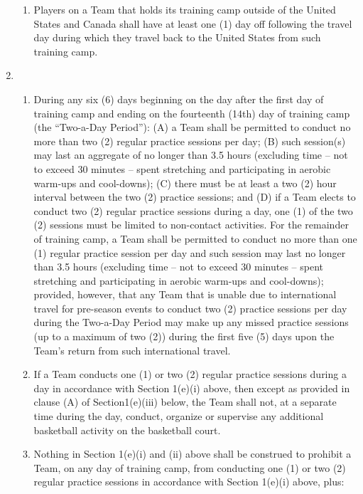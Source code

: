 \documentclass[
]{book}
\providecommand{\tightlist}{%
  \setlength{\itemsep}{0pt}\setlength{\parskip}{0pt}}
\begin{document}
\begin{enumerate}
\begin{enumerate}
  \item
    Players on a Team that holds its training camp outside of the United States and Canada shall have at least one (1) day off following the travel day during which they travel back to the United States from such training camp.
  \end{enumerate}
\item
  \begin{enumerate}
  \def\labelenumii{(\roman{enumii})}
  \tightlist
  \item
    During any six (6) days beginning on the day after the first day of training camp and ending on the fourteenth (14th) day of training camp (the ``Two-a-Day Period''): (A) a Team shall be permitted to conduct no more than two (2) regular practice sessions per day; (B) such session(s) may last an aggregate of no longer than 3.5 hours (excluding time -- not to exceed 30 minutes -- spent stretching and participating in aerobic warm-ups and cool-downs); (C) there must be at least a two (2) hour interval between the two (2) practice sessions; and (D) if a Team elects to conduct two (2) regular practice sessions during a day, one (1) of the two (2) sessions must be limited to non-contact activities. For the remainder of training camp, a Team shall be permitted to conduct no more than one (1) regular practice session per day and such session may last no longer than 3.5 hours (excluding time -- not to exceed 30 minutes -- spent stretching and participating in aerobic warm-ups and cool-downs); provided, however, that any Team that is unable due to international travel for pre-season events to conduct two (2) practice sessions per day during the Two-a-Day Period may make up any missed practice sessions (up to a maximum of two (2)) during the first five (5) days upon the Team's return from such international travel.
  \item
    If a Team conducts one (1) or two (2) regular practice sessions during a day in accordance with Section 1(e)(i) above, then except as provided in clause (A) of Section1(e)(iii) below, the Team shall not, at a separate time during the day, conduct, organize or supervise any additional basketball activity on the basketball court.
  \item
    Nothing in Section 1(e)(i) and (ii) above shall be construed to prohibit a Team, on any day of training camp, from conducting one (1) or two (2) regular practice sessions in accordance with Section 1(e)(i) above, plus:


\end{enumerate}
\end{enumerate}
\end{document}
